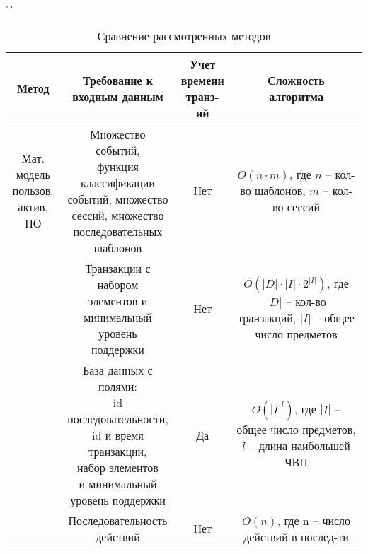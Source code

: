 \begin{table}[H]
	\begin{center}
		\caption{Сравнение рассмотренных методов}
		\label{tab}
		""\newline
		\begin{tabular}{ | c | c | c | c | }
			\hline
			Метод & \specialcell{Требование к\\ входным данным}  & \specialcell{Учет\\времени \\транз-ий} & \specialcell{Сложность\\алгоритма} \\ \hline
			
			\specialcell{Мат. модель\\пользов.\\актив. ПО} & \specialcell{Множество событий,\\функция классификации\\событий, множество\\сессий, множество\\последовательных\\шаблонов} & Нет & \specialcell{$O(n \cdot m)$, где $n$ --\\кол-во шаблонов,\\$m$ -- кол-во сессий} \\ \hline
			
			\specialcell{Apriori} & \specialcell{Транзакции с набором\\элементов и\\минимальный уровень\\поддержки} & Нет & \specialcell{$O(|D| \cdot |I| \cdot 2^{|I|})$,\\где $|D|$ -- кол-во\\транзакций,\\$|I|$ -- общее число\\предметов} \\ \hline
			
			\specialcell{GSP} & \specialcell{База данных с полями:\\id последовательности,\\id и время транзакции,\\набор элементов\\и минимальный\\уровень поддержки} & Да & \specialcell{$O(|I|^l)$, где $|I|$ --\\общее число\\предметов,\\$l$ -- длина\\наибольшей ЧВП} \\ \hline
			
			\specialcell{GOMS} & \specialcell{Последовательность\\действий} & Нет & \specialcell{$O(n)$, где n --\\число действий\\в послед-ти} \\ \hline
		\end{tabular}
	\end{center}
\end{table}

